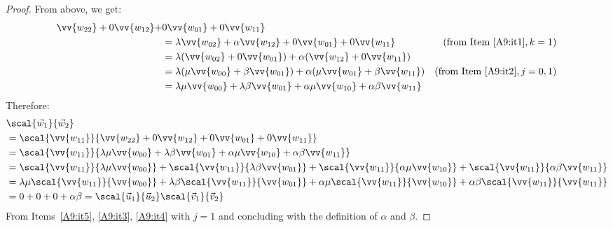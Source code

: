 \begin{lemma}
\begin{proof}
    From above, we get:
    \begin{align*}
        \vv{w_{22}} + 0\vv{w_{12}} + &0\vv{w_{01}} + 0\vv{w_{11}} \\
        &= \lambda\vv{w_{02}} + \alpha\vv{w_{12}} + 0\vv{w_{01}} + 0\vv{w_{11}} & (\text{from Item~\ref{A9:it1}}, k =1)\\
        &= \lambda(\vv{w_{02}}+0\vv{w_{01}}) + \alpha(\vv{w_{12}}+0\vv{w_{11}})&\\
        &= \lambda(\mu\vv{w_{00}} + \beta\vv{w_{01}}) + \alpha(\mu\vv{w_{01}}+\beta\vv{w_{11}}) & (\text{from Item~\ref{A9:it2}}, j=0,1)\\
        &= \lambda\mu\vv{w_{00}} + \lambda\beta\vv{w_{01}} + \alpha\mu\vv{w_{10}} + \alpha\beta\vv{w_{11}}
    \end{align*}
    Therefore:
    \begin{align*}
        &\scal{\vec{w}_{1}}{\vec{w}_{2}} \\
        &= \scal{\vv{w_{11}}}{\vv{w_{22}} + 0 \vv{w_{12}} + 0 \vv{w_{01}} + 0 \vv{w_{11}}}\\
        &= \scal{\vv{w_{11}}}{\lambda\mu\vv{w_{00}} + \lambda\beta\vv{w_{01}} + \alpha\mu\vv{w_{10}} + \alpha\beta\vv{w_{11}}}\\
        &=\scal{\vv{w_{11}}}{\lambda\mu\vv{w_{00}}} + \scal{\vv{w_{11}}}{\lambda\beta\vv{w_{01}}} + \scal{\vv{w_{11}}}{\alpha\mu\vv{w_{10}}} + \scal{\vv{w_{11}}}{\alpha\beta\vv{w_{11}}}\\
        &=\lambda\mu\scal{\vv{w_{11}}}{\vv{w_{00}}} + \lambda\beta\scal{\vv{w_{11}}}{\vv{w_{01}}} + \alpha\mu\scal{\vv{w_{11}}}{\vv{w_{10}}} + \alpha\beta\scal{\vv{w_{11}}}{\vv{w_{11}}}\\
        &= 0 + 0 + 0 + \alpha\beta = \scal{\vec{u}_{1}}{\vec{u}_{2}}\scal{\vec{v}_{1}}{\vec{v}_{2}}
    \end{align*}
  From Items~\ref{A9:it5}, \ref{A9:it3}, \ref{A9:it4} with $j=1$ and concluding with the definition of $\alpha$ and $\beta$.
\end{proof}
\end{lemma}

